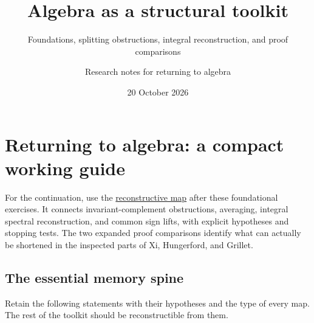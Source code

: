 \documentclass[
  11pt,
]{article}
\title{Algebra as a structural toolkit}
\subtitle{Foundations, splitting obstructions, integral reconstruction,
and proof comparisons}
\author{Research notes for returning to algebra}
\date{20 October 2026}
\let\originaltableofcontents\tableofcontents
\renewcommand{\tableofcontents}{\originaltableofcontents\clearpage}
\begin{document}
\maketitle

{
\hypersetup{linkcolor=}
\setcounter{tocdepth}{2}
\tableofcontents
}
\section*{Returning to algebra: a compact working
guide}\label{returning-to-algebra-a-compact-working-guide}

For the continuation, use the
\href{RECONSTRUCTION-MAP.md}{reconstructive map} after these
foundational exercises. It connects invariant-complement obstructions,
averaging, integral spectral reconstruction, and common sign lifts, with
explicit hypotheses and stopping tests. The two expanded proof
comparisons identify what can actually be shortened in the inspected
parts of Xi, Hungerford, and Grillet.

\subsection*{The essential memory
spine}\label{the-essential-memory-spine}

Retain the following statements with their hypotheses and the type of
every map. The rest of the toolkit should be reconstructible from them.
\end{document}

